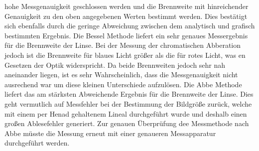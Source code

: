 hohe Messgenauigkeit geschlossen werden und die Brennweite mit hinreichender Genauigkeit zu den oben angegebenen Werten bestimmt werden. Dies bestätigt sich
ebenfalls durch die geringe Abweichung zwischen dem analytisch und grafisch bestimmten Ergebnis.
Die Bessel Methode liefert ein sehr genaues Messergebnis für die Brennweite der Linse. Bei der Messung der chromatischen Abberation jedoch ist die Brennweite für
blaues Licht größer als die für rotes Licht, was en Gesetzen der Optik widerspricht. Da beide Brennweiten jedoch sehr nah aneinander liegen, ist es sehr Wahrscheinlich,
dass die Messgenauigkeit nicht ausrechend war um diese kleinen Unterschiede aufzulösen.
Die Abbe Methode liefert das am stärksten Abweichende Ergebnis für die Brennweite der Linse. Dies geht vermutlich auf Messfehler bei der Bestimmung der Bildgröße
zurück, welche mit einem per Henad gehaltenem Lineal durchgeführt wurde und deshalb einen großen Ablesefehler generiert. Zur genauen Überprüfung dee Messmethode nach Abbe
müsste die Messung erneut mit einer genaueren Messapparatur durchgeführt werden.

